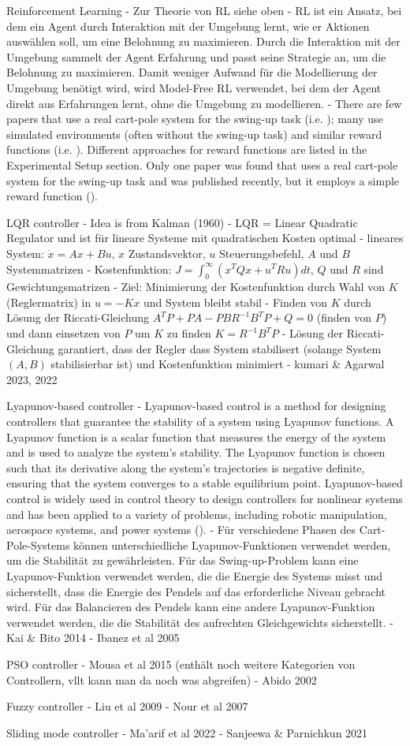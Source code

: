 Reinforcement Learning
- Zur Theorie von RL siehe oben
- RL ist ein Ansatz, bei dem ein Agent durch Interaktion mit der Umgebung lernt, wie er Aktionen auswählen soll, um eine Belohnung zu maximieren. Durch die Interaktion mit der Umgebung sammelt der Agent Erfahrung und passt seine Strategie an, um die Belohnung zu maximieren. Damit weniger Aufwand für die Modellierung der Umgebung benötigt wird, wird Model-Free RL verwendet, bei dem der Agent direkt aus Erfahrungen lernt, ohne die Umgebung zu modellieren.
- There are few papers that use a real cart-pole system for the swing-up task (i.e. \cite{nayante_reinforcement_2021,pilcolearner_cart-pole_2011,deisenroth_pilco_2011}); many use simulated environments (often without the swing-up task) and similar reward functions (i.e. \cite{kumar_balancing_2020,liu_swing-up_2023,kimura_stochastic_1999}). Different approaches for reward functions are listed in the Experimental Setup section. Only one paper was found that uses a real cart-pole system for the swing-up task and was published recently, but it employs a simple reward function (\cite{nayante_reinforcement_2021}).

LQR controller
- Idea is from Kalman (1960)
- LQR = Linear Quadratic Regulator und ist für lineare Systeme mit quadratischen Kosten optimal
- lineares System: $\dot{x} = Ax + Bu$, $x$ Zustandsvektor, $u$ Steuerungsbefehl, $A$ und $B$ Systemmatrizen
- Kostenfunktion: $J = \int_0^\infty (x^T Q x + u^T R u) dt$, $Q$ und $R$ sind Gewichtungsmatrizen
- Ziel: Minimierung der Kostenfunktion durch Wahl von $K$ (Reglermatrix) in $u = -Kx$ und System bleibt stabil
- Finden von $K$ durch Lösung der Riccati-Gleichung $A^T P + PA - PBR^{-1}B^T P + Q = 0$ (finden von $P$) und dann einsetzen von $P$ um $K$ zu finden $K = R^{-1}B^T P$
- Lösung der Riccati-Gleichung garantiert, dass der Regler dass System stabilisert (solange System $(A,B)$ stabilisierbar ist) und Kostenfunktion minimiert
- kumari & Agarwal 2023, 2022

Lyapunov-based controller
- Lyapunov-based control is a method for designing controllers that guarantee the stability of a system using Lyapunov functions. A Lyapunov function is a scalar function that measures the energy of the system and is used to analyze the system's stability. The Lyapunov function is chosen such that its derivative along the system's trajectories is negative definite, ensuring that the system converges to a stable equilibrium point. Lyapunov-based control is widely used in control theory to design controllers for nonlinear systems and has been applied to a variety of problems, including robotic manipulation, aerospace systems, and power systems (\cite{slotine_applied_1991}).
- Für verschiedene Phasen des Cart-Pole-Systems können unterschiedliche Lyapunov-Funktionen verwendet werden, um die Stabilität zu gewährleisten. Für das Swing-up-Problem kann eine Lyapunov-Funktion verwendet werden, die die Energie des Systems misst und sicherstellt, dass die Energie des Pendels auf das erforderliche Niveau gebracht wird. Für das Balancieren des Pendels kann eine andere Lyapunov-Funktion verwendet werden, die die Stabilität des aufrechten Gleichgewichts sicherstellt.
- Kai & Bito 2014
- Ibanez et al 2005

PSO controller
- Mousa et al 2015 (enthält noch weitere Kategorien von Controllern, vllt kann man da noch was abgreifen)
- Abido 2002

Fuzzy controller
- Liu et al 2009
- Nour et al 2007

Sliding mode controller
- Ma'arif et al 2022
- Sanjeewa & Parnichkun 2021
